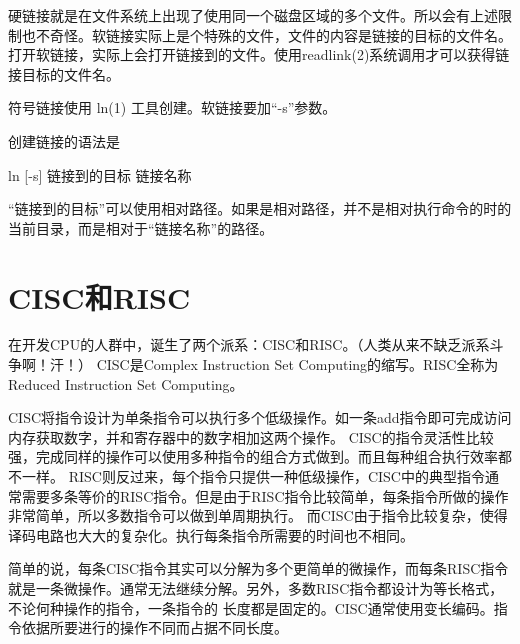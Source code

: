 硬链接就是在文件系统上出现了使用同一个磁盘区域的多个文件。所以会有上述限制也不奇怪。软链接实际上是个特殊的文件，文件的内容是链接的目标的文件名。打开软链接，实际上会打开链接到的文件。使用readlink(2)系统调用才可以获得链接目标的文件名。

符号链接使用 ln(1) 工具创建。软链接要加“-s”参数。

创建链接的语法是

\begin{code}
ln [-s] 链接到的目标 链接名称
\end{code}


“链接到的目标”可以使用相对路径。如果是相对路径，并不是相对执行命令的时的当前目录，而是相对于“链接名称”的路径。

\section{CISC和RISC}\label{FAQ:CISCandRISC}

在开发CPU的人群中，诞生了两个派系：CISC和RISC。（人类从来不缺乏派系斗争啊！汗！）
CISC是{}Complex Instruction Set Computing{}的缩写。RISC全称为{}Reduced Instruction Set Computing{}。

CISC{}将指令设计为单条指令可以执行多个低级操作。如一条add指令即可完成访问内存获取数字，并和寄存器中的数字相加这两个操作。
CISC的指令灵活性比较强，完成同样的操作可以使用多种指令的组合方式做到。而且每种组合执行效率都不一样。
RISC则反过来，每个指令只提供一种低级操作，CISC中的典型指令通常需要多条等价的RISC指令。但是由于RISC指令比较简单，每条指令所做的操作非常简单，所以多数指令可以做到单周期执行。
而CISC由于指令比较复杂，使得译码电路也大大的复杂化。执行每条指令所需要的时间也不相同。

简单的说，每条CISC指令其实可以分解为多个更简单的微操作，而每条RISC指令就是一条微操作。通常无法继续分解。另外，多数RISC指令都设计为等长格式，不论何种操作的指令，一条指令的
长度都是固定的。CISC通常使用变长编码。指令依据所要进行的操作不同而占据不同长度。

